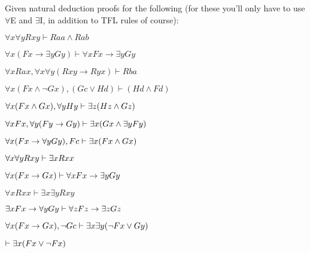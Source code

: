 \problempart Given natural deduction proofs for the following (for these you'll only have to use $\forall$E and $\exists$I, in addition to TFL rules of course):


\begin{earg}
\item $\forall x\forall y Rxy \vdash Raa \land Rab$
\item $\forall x(Fx \rightarrow \exists yGy) \vdash \forall x Fx \rightarrow \exists y Gy$
\item $\forall xRax, \forall x \forall y(Rxy \rightarrow Ryx) \vdash Rba$
\item $\forall x(Fx \land \lnot Gx), (Gc \lor Hd) \vdash (Hd \land Fd)$
\item $\forall x(Fx \wedge Gx), \forall yHy \vdash \exists z(Hz \wedge Gz)$
\item $\forall xFx, \forall y (Fy \rightarrow Gy) \vdash \exists x(Gx \wedge \exists yFy)$
\item $\forall x(Fx \rightarrow \forall yGy), Fc \vdash \exists x(Fx \wedge Gx)$
\item $\forall x \forall y Rxy \vdash \exists x Rxx$
\item $\forall x(Fx \rightarrow Gx) \vdash \forall xFx \rightarrow \exists yGy$
\item $\forall xRxx \vdash \exists x \exists y Rxy$
\item $\exists xFx \rightarrow \forall y Gy \vdash \forall z Fz \rightarrow \exists zGz$
\item $\forall x(Fx \rightarrow Gx), \neg Gc \vdash \exists x\exists y(\neg Fx \vee Gy)$
\item $\vdash \exists x(Fx \vee \neg Fx)$
\end{earg}




